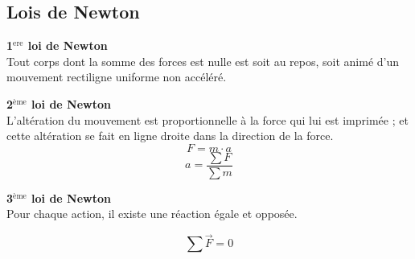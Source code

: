 \documentclass[12pt,a4paper]{article} %
\newcommand\textsup[1]{\ensuremath{^{\textrm{#1}}}}
\begin{document}
\subsection{Lois de Newton}
\begin{mdframed}[leftmargin=2em, rightmargin=2em]
	\textbf{1\textsup{ere} loi de Newton} \\ \hspace{0.5em}
	Tout corps dont la somme des forces est nulle est soit au repos, soit animé d'un mouvement rectiligne uniforme non accéléré.
\end{mdframed}
\par\hspace{1em}
\begin{mdframed}[leftmargin=2em, rightmargin=2em]
	\textbf{2\textsup{ème} loi de Newton} \\ \hspace{0.5em}
	L'altération du mouvement est proportionnelle à la force qui lui est imprimée ; et cette altération se fait en ligne droite dans la direction de la force.	
	\begin{equation*}
		F = m \cdot a
	\end{equation*}
	\begin{equation*}
		a = \frac{\sum F}{\sum m}
	\end{equation*}
\end{mdframed}
\par\hspace{1em}
\begin{mdframed}[leftmargin=2em, rightmargin=2em]
	\textbf{3\textsup{ème} loi de Newton} \\ \hspace{0.5em}
	Pour chaque action, il existe une réaction égale et opposée.

	\begin{equation*}
		\sum\overrightarrow{F} = 0
	\end{equation*}
\end{mdframed}

\newpage
\end{document}
